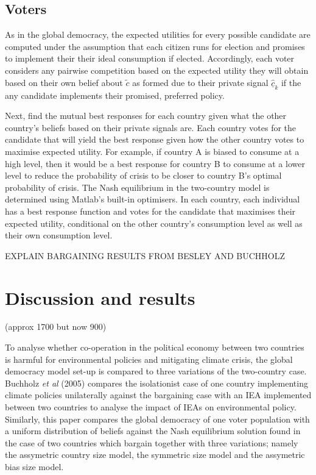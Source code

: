 \documentclass[11pt,preprint, authoryear]{elsarticle}
\numberwithin{equation}{section}
\numberwithin{figure}{section}
\numberwithin{table}{section}
\begin{document}
\hypertarget{voters-1}{%
\subsection*{Voters}\label{voters-1}}

As in the global democracy, the expected utilities for every possible
candidate are computed under the assumption that each citizen runs for
election and promises to implement their their ideal consumption if
elected. Accordingly, each voter considers any pairwise competition
based on the expected utility they will obtain based on their own belief
about \(\tilde{c}\) as formed due to their private signal
\(\hat{\underline{c}}_k\) if the any candidate implements their
promised, preferred policy.

Next, find the mutual best responses for each country given what the
other country's beliefs based on their private signals are. Each country
votes for the candidate that will yield the best response given how the
other country votes to maximise expected utility. For example, if
country A is biased to consume at a high level, then it would be a best
response for country B to consume at a lower level to reduce the
probability of crisis to be closer to country B's optimal probability of
crisis. The Nash equilibrium in the two-country model is determined
using Matlab's built-in optimisers. In each country, each individual has
a best response function and votes for the candidate that maximises
their expected utility, conditional on the other country's consumption
level as well as their own consumption level.

EXPLAIN BARGAINING RESULTS FROM BESLEY AND BUCHHOLZ

\hypertarget{discussion-and-results}{%
\section{Discussion and results}\label{discussion-and-results}}

(approx 1700 but now 900)

To analyse whether co-operation in the political economy between two
countries is harmful for environmental policies and mitigating climate
crisis, the global democracy model set-up is compared to three
variations of the two-country case. Buchholz \emph{et al} (2005)
compares the isolationist case of one country implementing climate
policies unilaterally against the bargaining case with an IEA
implemented between two countries to analyse the impact of IEAs on
environmental policy. Similarly, this paper compares the global
democracy of one voter population with a uniform distribution of beliefs
against the Nash equilibrium solution found in the case of two countries
which bargain together with three variations; namely the assymetric
country size model, the symmetric size model and the assymetric bias
size model.
\end{document}
